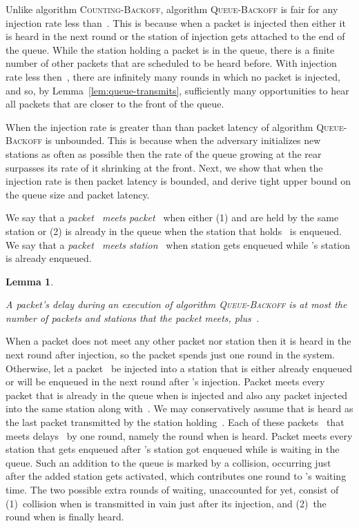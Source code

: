 \documentclass[11pt]{article}
\newcommand{\qed}{\hfill  \smallbreak}
\newenvironment{proof}{\noindent{\bf Proof:}}{\qed}
\newtheorem{lemma}{Lemma}
\begin{document}
Unlike algorithm \textsc{Counting-Backoff}, algorithm \textsc{Queue-Backoff} is fair for any injection rate less than~.
This is because when a packet is injected then either it is heard in the next round or the station of injection gets attached to the end of the queue. 
While the station holding a packet is in the queue, there is a finite number of other packets that are scheduled to be heard before.
With injection rate less then~, there are infinitely many rounds in which no packet is injected, and so, by Lemma~\ref{lem:queue-transmits}, sufficiently many opportunities to hear all packets that are closer to the front of the queue.

When the injection rate is greater than  than packet latency of algorithm \textsc{Queue-Backoff} is unbounded.
This is because when the adversary initializes new stations as often as possible then the rate of the queue growing at the rear surpasses its rate of it shrinking at the front.
Next, we show that when the injection rate is  then packet latency is bounded, and derive tight upper bound on the queue size and packet latency.

We say that a \emph{packet~ meets packet~} when either (1)  and  are held by the same station or (2)  is already in the queue when the station that holds~ is enqueued.
We say that a \emph{packet~ meets station~} when station  gets enqueued while 's station is already enqueued.

\begin{lemma}
\label{lem:meeting-packets}

A packet's delay during an execution of algorithm \textsc{Queue-Backoff} is at most the number of packets and stations that the packet meets, plus~.
\end{lemma}

\begin{proof}
When a packet  does not meet any other packet nor station then it is  heard in the next round after injection, so the packet spends just one round in the system.
Otherwise, let a packet~ be injected into a station that is either already enqueued or will be enqueued in the next round after 's injection.
Packet  meets every packet that is already in the queue when  is injected and also any packet injected into the same station along with~.
We may conservatively assume that  is heard as the last packet transmitted by the station holding~.
Each of these packets~ that  meets delays~ by one round, namely the round when  is heard.
Packet  meets every station that gets enqueued after 's station got enqueued while  is waiting in the queue.
Such an addition to the queue is marked by a collision, occurring just after the added station gets activated, which  contributes one round to 's waiting time.
The two possible extra rounds of  waiting, unaccounted for yet, consist of (1)~collision when  is transmitted in vain just after its injection, and (2)~the round when  is finally heard.
\end{proof}
\end{document}
